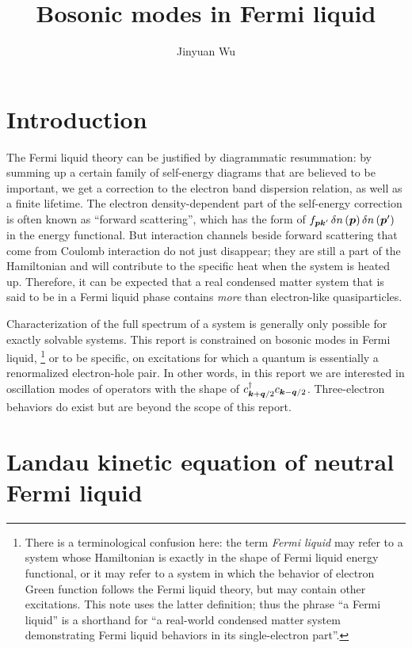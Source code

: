 \documentclass[hyperref, a4paper]{article}
\title{Bosonic modes in Fermi liquid}
\author{Jinyuan Wu}
\newcommand*{\term}[1]{\textit{#1}}
\begin{document}
\maketitle

\section{Introduction}

The Fermi liquid theory can be justified by diagrammatic resummation: 
by summing up a certain family of self-energy diagrams
that are believed to be important, 
we get a correction to the electron band dispersion relation,
as well as a finite lifetime.
The electron density-dependent part of the self-energy correction 
is often known as ``forward scattering'',
which has the form of $f_{\vb*{p} \vb*{k}'} \var{n}(\vb*{p}) \var{n}(\vb*{p}')$ 
in the energy functional.
But interaction channels beside forward scattering 
that come from Coulomb interaction do not just disappear;
they are still a part of the Hamiltonian
and will contribute to the specific heat 
when the system is heated up.
Therefore, it can be expected that a real condensed matter system 
that is said to be in a Fermi liquid phase 
contains \emph{more} than electron-like quasiparticles. 

Characterization of the full spectrum of a system is 
generally only possible for exactly solvable systems. 
This report is constrained on bosonic modes in Fermi liquid,%
\footnote{
    There is a terminological confusion here: 
    the term \term{Fermi liquid} may refer to 
    a system whose Hamiltonian is exactly in the shape of 
    Fermi liquid energy functional,
    or it may refer to a system 
    in which the behavior of electron Green function 
    follows the Fermi liquid theory, 
    but may contain other excitations.
    This note uses the latter definition;
    thus the phrase ``a Fermi liquid'' 
    is a shorthand for ``a real-world condensed matter system 
    demonstrating Fermi liquid behaviors in its single-electron part''.
}
or to be specific, on excitations 
for which a quantum is essentially a renormalized electron-hole pair.
In other words, in this report 
we are interested in oscillation modes of 
operators with the shape of $c^\dagger_{\vb*{k} + \vb*{q} / 2} c_{\vb*{k} - \vb*{q} / 2}$.
Three-electron behaviors do exist \cite{patton2003trion,singh2016trion}
but are beyond the scope of this report.

\section{Landau kinetic equation of neutral Fermi liquid}
\end{document}
